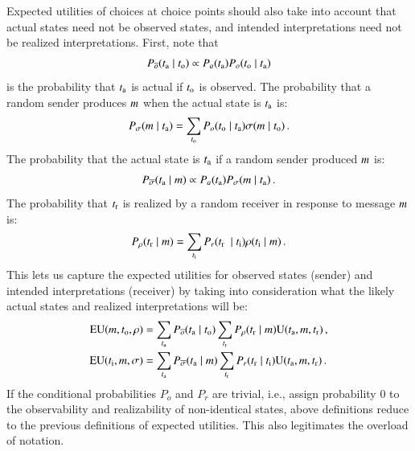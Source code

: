 \documentclass[fleqn,reqno,10pt]{article}
\begin{document}
Expected utilities of choices at choice points should also take into account that actual states
need not be observed states, and intended interpretations need not be realized
interpretations. First, note that
\begin{align*}
  P_{\overline{o}}(t_{\mathrm{a}} \mid t_{\mathrm{o}}) \propto P_a(t_{\mathrm{a}}) P_o(t_{\mathrm{o}}
    \mid t_{\mathrm{a}})
\end{align*}
is the probability that $t_{\mathrm{a}}$ is actual if $t_{\mathrm{o}}$ is observed. The probability
that a random sender produces $m$ when the actual state is $t_{\mathrm{a}}$ is:
\begin{align*}
  P_{\sigma}(m \mid t_{\mathrm{a}}) = \sum_{t_{\mathrm{o}}} P_o(t_{\mathrm{o}} \mid
  t_{\mathrm{a}}) \sigma(m \mid t_{\mathrm{o}})\,. 
\end{align*}
The probability that the actual state is $t_{\mathrm{a}}$ if a random sender produced $m$ is:
\begin{align*}
  P_{\overline{\sigma}}(t_{\mathrm{a}} \mid m) \propto P_a(t_{\mathrm{a}})
  P_{\sigma}(m \mid t_{\mathrm{a}})\,. 
\end{align*}
The probability that $t_{\mathrm{r}}$ is realized by a random receiver in response to
message $m$ is:
\begin{align*}
  P_{\rho}(t_{\mathrm{r}} \mid m) = \sum_{t_{\mathrm{i}}} P_r(t_{\mathrm{r}} \ \mid
  t_{\mathrm{i}}) \rho(t_{\mathrm{i}} \mid m)\,.
\end{align*}
This lets us capture the expected utilities for observed states (sender) and intended
interpretations (receiver) by taking into consideration what the likely actual states and
realized interpretations will be:
\begin{align*}
  \mathrm{EU}(m , t_{\mathrm{o}}, \rho) & = \sum_{t_{\mathrm{a}}}  P_{\overline{o}}(t_{\mathrm{a}}
  \mid t_{\mathrm{o}}) \sum_{t_{\mathrm{r}}}  P_{\rho}(t_{\mathrm{r}} \mid
  m) \mathrm{U}(t_{\mathrm{a}}, m, t_{\mathrm{r}})\,, \\
  \mathrm{EU}(t_{\mathrm{i}} , m, \sigma) & = \sum_{t_{\mathrm{a}}}
  P_{\overline{\sigma}}(t_{\mathrm{a}} \mid m) \sum_{t_{\mathrm{r}}}
  P_{r}(t_{\mathrm{r}} \mid t_{\mathrm{i}})  \mathrm{U}(t_{\mathrm{a}}, m, t_{\mathrm{r}})\,.
\end{align*}
If the conditional probabilities $P_o$ and $P_r$ are trivial, i.e., assign probability 0 to the
observability and realizability of non-identical states, above definitions reduce to the
previous definitions of expected utilities. This also legitimates the overload of notation.
\end{document}
